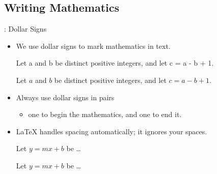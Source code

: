 \documentclass{beamer}
\begin{document}
\subsection*{Writing Mathematics}
\begin{frame}[fragile]{\insertsubsection{}: Dollar Signs}
\begin{itemize}
\item We use dollar signs \keystrokebftt{\$} to mark mathematics in text.\\[1ex]
\begin{exampletwouptiny}
Let a and b be distinct positive
integers, and let c = a - b + 1.

Let $a$ and $b$ be distinct positive
integers, and let $c = a - b + 1$.
\end{exampletwouptiny}
\item Always use dollar signs in pairs
\begin{itemize}
  \item one to begin the mathematics, and one to end it.
\end{itemize}
\item \LaTeX{} handles spacing automatically; it ignores your spaces.
\begin{exampletwouptiny}
Let $y=mx+b$ be \ldots

Let $y = m x + b$ be \ldots
\end{exampletwouptiny}
\end{itemize}
\end{frame}
\end{document}
